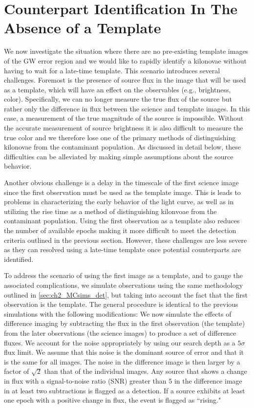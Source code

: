 \section{Counterpart Identification In The Absence of a Template}
\label{sec:ch2_diff}
We now investigate the situation where there are no pre-existing template images of the GW error region and we would like to rapidly identify a kilonovae without having to wait for a late-time template. This scenario introduces several challenges. Foremost is the presence of source flux in the image that will be used as a template, which will have an effect on the observables (e.g., brightness, color). Specifically, we can no longer measure the true flux of the source but rather only the difference in flux between the science and template images. In this case, a measurement of the true magnitude of the source is impossible. Without the accurate measurement of source brightness it is also difficult to measure the true color and we therefore lose one of the primary methods of distinguishing kilonovae from the contaminant population. As discussed in detail below, these difficulties can be alleviated by making simple assumptions about the source behavior.

Another obvious challenge is a delay in the timescale of the first science image since the first observation must be used as the template image. This is leads to problems in characterizing  the early behavior of the light curve, as well as in utilizing the rise time as a method of distinguishing kilonvoae from the contaminant population. Using the first observation as a template also reduces the number of available epochs making it more difficult to meet the detection criteria outlined in the previous section. However, these challenges are less severe as they can resolved using a late-time template once potential counterparts are identified.

To address the scenario of using the first image as a template, and to gauge the associated complications, we simulate observations using the same methodology outlined in \autoref{sec:ch2_MCsims_det}, but taking into account the fact that the first observation is the template. The general procedure is identical to the previous simulations with the following modifications: We now simulate the effects of difference imaging by subtracting the flux in the first observation (the template) from the later observations (the science images) to produce a set of difference fluxes. We account for the noise appropriately by using our search depth as a $5\sigma$ flux limit. We assume that this noise is the dominant source of error and that it is the same for all images. The noise in the difference image is then larger by a factor of $\sqrt{2}$ than that of the individual images. Any source that shows a change in flux with a signal-to-noise ratio (SNR) greater than 5 in the difference image in at least two subtractions is flagged as a detection. If a source exhibits at least one epoch with a positive change in flux, the event is flagged as ``rising."

